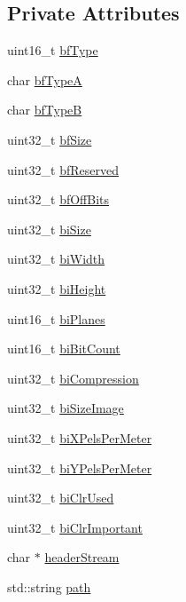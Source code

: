 \subsection*{Private Attributes}
\begin{DoxyCompactItemize}
\item 
uint16\+\_\+t \mbox{\hyperlink{classBitmapHeader_a84fd6f0b94fd4f47ddfea7c3439e8531}{bf\+Type}}
\item 
char \mbox{\hyperlink{classBitmapHeader_a27de047b18f59853f385b26b9fd74d20}{bf\+TypeA}}
\item 
char \mbox{\hyperlink{classBitmapHeader_a3fbb12d28c1be3095b72a5eebeaa4445}{bf\+TypeB}}
\item 
uint32\+\_\+t \mbox{\hyperlink{classBitmapHeader_ac27568af32658738302d20edab99bb4b}{bf\+Size}}
\item 
uint32\+\_\+t \mbox{\hyperlink{classBitmapHeader_abb50b0ca8951540f0bec6fe21b0a7587}{bf\+Reserved}}
\item 
uint32\+\_\+t \mbox{\hyperlink{classBitmapHeader_a0b3470f079b95b2a6f053ad7d860ec06}{bf\+Off\+Bits}}
\item 
uint32\+\_\+t \mbox{\hyperlink{classBitmapHeader_ad9bbbb6a668069bd7e6cd16adedce38f}{bi\+Size}}
\item 
uint32\+\_\+t \mbox{\hyperlink{classBitmapHeader_a6058b8b953cfe11ccb6992077e0353d0}{bi\+Width}}
\item 
uint32\+\_\+t \mbox{\hyperlink{classBitmapHeader_a76091025a4295933d3127ae41c6e6611}{bi\+Height}}
\item 
uint16\+\_\+t \mbox{\hyperlink{classBitmapHeader_ae3a65beab7af6e5dc8c9cda16bacc950}{bi\+Planes}}
\item 
uint16\+\_\+t \mbox{\hyperlink{classBitmapHeader_a9156116cca1502fb3f49f3da3890c70d}{bi\+Bit\+Count}}
\item 
uint32\+\_\+t \mbox{\hyperlink{classBitmapHeader_a07680e0e463506764ac69707bc51900c}{bi\+Compression}}
\item 
uint32\+\_\+t \mbox{\hyperlink{classBitmapHeader_a4ca96d50917d71818b503ebbe854503f}{bi\+Size\+Image}}
\item 
uint32\+\_\+t \mbox{\hyperlink{classBitmapHeader_a1569e156f59c8a939c9d4b668ae41bcd}{bi\+X\+Pels\+Per\+Meter}}
\item 
uint32\+\_\+t \mbox{\hyperlink{classBitmapHeader_a9f029a3b36773c4da51c18e0453213c7}{bi\+Y\+Pels\+Per\+Meter}}
\item 
uint32\+\_\+t \mbox{\hyperlink{classBitmapHeader_a621822a0df6f18b2f5f6bbebed1de028}{bi\+Clr\+Used}}
\item 
uint32\+\_\+t \mbox{\hyperlink{classBitmapHeader_ad90b0f2883207798cdd26f69af5510ba}{bi\+Clr\+Important}}
\item 
char $\ast$ \mbox{\hyperlink{classBitmapHeader_a9109a897251733f77942008318482426}{header\+Stream}}
\item 
std\+::string \mbox{\hyperlink{classBitmapHeader_a928111fbaf59eebf24b750cbca11c5dd}{path}}
\end{DoxyCompactItemize}


